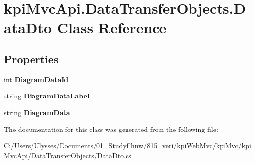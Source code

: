 \hypertarget{classkpi_mvc_api_1_1_data_transfer_objects_1_1_data_dto}{}\section{kpi\+Mvc\+Api.\+Data\+Transfer\+Objects.\+Data\+Dto Class Reference}
\label{classkpi_mvc_api_1_1_data_transfer_objects_1_1_data_dto}
\subsection*{Properties}
\begin{DoxyCompactItemize}
\item 
\mbox{\label{classkpi_mvc_api_1_1_data_transfer_objects_1_1_data_dto_a5ef1644e030d8f6c6c4cc9586d9785a8}} 
int {\bfseries Diagram\+Data\+Id}
\item 
\mbox{\label{classkpi_mvc_api_1_1_data_transfer_objects_1_1_data_dto_a254f6a81553c189064bb5f995cdda432}} 
string {\bfseries Diagram\+Data\+Label}
\item 
\mbox{\label{classkpi_mvc_api_1_1_data_transfer_objects_1_1_data_dto_a64a3eaddca9610715ac774a9fdcf94f0}} 
string {\bfseries Diagram\+Data}
\end{DoxyCompactItemize}


The documentation for this class was generated from the following file\+:\begin{DoxyCompactItemize}
\item 
C\+:/\+Users/\+Ulysses/\+Documents/01\+\_\+\+Study\+Fhnw/815\+\_\+veri/kpi\+Web\+Mvc/kpi\+Mvc/kpi\+Mvc\+Api/\+Data\+Transfer\+Objects/Data\+Dto.\+cs\end{DoxyCompactItemize}

